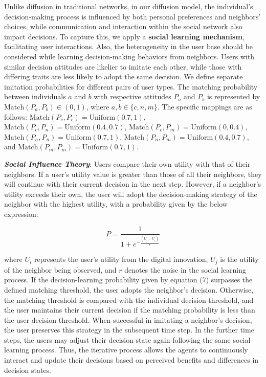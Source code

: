 \documentclass{article} %
\begin{document}
Unlike diffusion in traditional networks, in our diffusion model, the individual’s decision-making process is influenced by both personal preferences and neighbors' choices, while communication and interaction within the social network also impact decisions. To capture this, we apply a \textbf{social learning mechanism}, facilitating user interactions. Also, the heterogeneity in the user base should be considered while learning decision-making behaviors from neighbors. Users with similar decision attitudes are likelier to imitate each other, while those with differing traits are less likely to adopt the same decision. We define separate imitation probabilities for different pairs of user types. The matching probability between individuals \( a \) and \( b \) with respective attitudes \( P_a \) and \( P_b \) is represented by \( \text{Match}(P_a, P_b) \in (0, 1) \), where \( a, b \in \{c, n, m\} \). The specific mappings are as follows: \( \text{Match}(P_c, P_c) = \text{Uniform}(0.7, 1) \), \( \text{Match}(P_c, P_n) = \text{Uniform}(0.4, 0.7) \), \( \text{Match}(P_c, P_m) = \text{Uniform}(0, 0.4) \), \( \text{Match}(P_n, P_n) = \text{Uniform}(0.7, 1) \), \( \text{Match}(P_n, P_m) = \text{Uniform}(0.4, 0.7) \), and \( \text{Match}(P_m, P_m) = \text{Uniform}(0.7, 1) \).

\textit{\textbf{Social Influence Theory}}: Users compare their own utility with that of their neighbors. If a user’s utility value is greater than those of all their neighbors, they will continue with their current decision in the next step. However, if a neighbor’s utility exceeds their own, the user will adopt the decision-making strategy of the neighbor with the highest utility, with a probability given by the below expression:

\begin{equation}
P = \frac{1}{1 + e^{-\frac{(U_j - U_i)}{r}}}
\end{equation}

where \( U_i \) represents the user’s utility from the digital innovation, \( U_j \) is the utility of the neighbor being observed, and \( r \) denotes the noise in the social learning process. If the decision-learning probability given by equation (7) surpasses the defined matching threshold, the user adopts the neighbor's decision. Otherwise, the matching threshold is compared with the individual decision threshold, and the user maintains their current decision if the matching probability is less than the user decision threshold. When successful in imitating a neighbor's decision, the user preserves this strategy in the subsequent time step. In the further time steps, the users may adjust their decision state again following the same social learning process. Thus, the iterative process allows the agents to continuously interact and update their decisions based on perceived benefits and differences in decision states.
\end{document}
